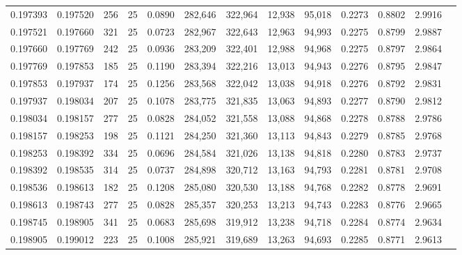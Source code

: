 \begin{tabular}{rrrrrrrrrrrrr}
0.197393 & 0.197520 &   256 &  25 &                                     0.0890 & 282,646 & 322,964 &  12,938 &  95,018 & 0.2273 & 0.8802 & 2.9916 \\
0.197521 & 0.197660 &   321 &  25 &                                     0.0723 & 282,967 & 322,643 &  12,963 &  94,993 & 0.2275 & 0.8799 & 2.9887 \\
0.197660 & 0.197769 &   242 &  25 &                                     0.0936 & 283,209 & 322,401 &  12,988 &  94,968 & 0.2275 & 0.8797 & 2.9864 \\
0.197769 & 0.197853 &   185 &  25 &                                     0.1190 & 283,394 & 322,216 &  13,013 &  94,943 & 0.2276 & 0.8795 & 2.9847 \\
0.197853 & 0.197937 &   174 &  25 &                                     0.1256 & 283,568 & 322,042 &  13,038 &  94,918 & 0.2276 & 0.8792 & 2.9831 \\
0.197937 & 0.198034 &   207 &  25 &                                     0.1078 & 283,775 & 321,835 &  13,063 &  94,893 & 0.2277 & 0.8790 & 2.9812 \\
0.198034 & 0.198157 &   277 &  25 &                                     0.0828 & 284,052 & 321,558 &  13,088 &  94,868 & 0.2278 & 0.8788 & 2.9786 \\
0.198157 & 0.198253 &   198 &  25 &                                     0.1121 & 284,250 & 321,360 &  13,113 &  94,843 & 0.2279 & 0.8785 & 2.9768 \\
0.198253 & 0.198392 &   334 &  25 &                                     0.0696 & 284,584 & 321,026 &  13,138 &  94,818 & 0.2280 & 0.8783 & 2.9737 \\
0.198392 & 0.198535 &   314 &  25 &                                     0.0737 & 284,898 & 320,712 &  13,163 &  94,793 & 0.2281 & 0.8781 & 2.9708 \\
0.198536 & 0.198613 &   182 &  25 &                                     0.1208 & 285,080 & 320,530 &  13,188 &  94,768 & 0.2282 & 0.8778 & 2.9691 \\
0.198613 & 0.198743 &   277 &  25 &                                     0.0828 & 285,357 & 320,253 &  13,213 &  94,743 & 0.2283 & 0.8776 & 2.9665 \\
0.198745 & 0.198905 &   341 &  25 &                                     0.0683 & 285,698 & 319,912 &  13,238 &  94,718 & 0.2284 & 0.8774 & 2.9634 \\
0.198905 & 0.199012 &   223 &  25 &                                     0.1008 & 285,921 & 319,689 &  13,263 &  94,693 & 0.2285 & 0.8771 & 2.9613 \\

\end{tabular}
